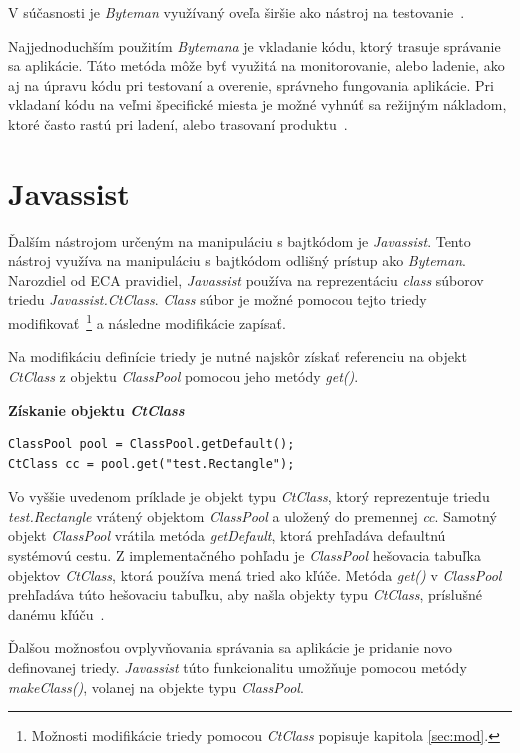 \documentclass[11pt,final,oneside]{fithesis}
\newenvironment{example}[1]
{
\vspace{3mm}
\noindent\textbf{#1}
\vspace{2mm}
}
{
\vspace{3mm}
}
\begin{document}
V súčasnosti je \textit{Byteman} využívaný oveľa širšie ako nástroj na
testovanie~\cite{RedHat:Byteman}. 

Najjednoduchším použitím \textit{Bytemana} je vkladanie kódu, ktorý trasuje 
správanie sa aplikácie. Táto metóda môže byť využitá na monitorovanie,
alebo ladenie, ako aj na úpravu kódu pri testovaní a overenie, správneho 
fungovania aplikácie. Pri vkladaní kódu na veľmi špecifické miesta je možné
vyhnúť sa režijným nákladom, ktoré často rastú pri ladení, alebo trasovaní 
produktu~\cite{Byteman:Homepage}.

\chapter{Javassist}

Ďalším nástrojom určeným na manipuláciu s bajtkódom je \textit{Javassist}. 
Tento nástroj využíva na manipuláciu s bajtkódom odlišný prístup ako
\textit{Byteman}. Narozdiel od ECA pravidiel, \textit{Javassist} používa na 
reprezentáciu \textit{class} súborov triedu \textit{Javassist.CtClass}.
\textit{Class} súbor je možné pomocou tejto triedy
modifikovať~\footnote{Možnosti modifikácie triedy pomocou \textit{CtClass} 
popisuje kapitola \ref{sec:mod}.} a následne modifikácie zapísať.

Na modifikáciu definície triedy je nutné najskôr získať referenciu na objekt
\textit{CtClass} z objektu \textit{ClassPool} pomocou jeho metódy
\textit{get()}.

\begin{example}{Získanie objektu \textit{CtClass}}
\begin{verbatim}
ClassPool pool = ClassPool.getDefault();
CtClass cc = pool.get("test.Rectangle");
\end{verbatim}
\end{example}

Vo vyššie uvedenom príklade je objekt typu \textit{CtClass}, ktorý reprezentuje
triedu \textit{test.Rectangle} vrátený objektom \textit{ClassPool} a uložený do
premennej \textit{cc}. Samotný objekt \textit{ClassPool} vrátila metóda 
\textit{getDefault}, ktorá prehľadáva defaultnú systémovú cestu. Z 
implementačného pohľadu je \textit{ClassPool} hešovacia tabuľka objektov
\textit{CtClass}, ktorá používa mená tried ako kľúče. Metóda \textit{get()} v
\textit{ClassPool} prehľadáva túto hešovaciu tabuľku, aby našla objekty typu
\textit{CtClass}, príslušné danému kľúču~\cite{Chiba:Javassist}.

Ďalšou možnosťou ovplyvňovania správania sa aplikácie je pridanie novo 
definovanej triedy. \textit{Javassist} túto funkcionalitu umožňuje pomocou 
metódy \textit{makeClass()}, volanej na objekte typu \textit{ClassPool}.
\end{document}
